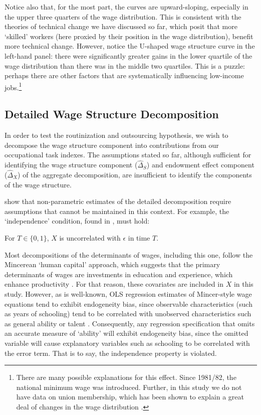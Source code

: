 Notice also that, for the most part, the curves are upward-sloping, especially in the upper three quarters of the wage distribution. This is consistent with the theories of technical change we have discussed so far, which posit that more `skilled' workers (here proxied by their position in the wage distribution), benefit more technical change. However, notice the U-shaped wage structure curve in the left-hand panel: there were significantly greater gains in the lower quartile of the wage distribution than there was in the middle two quartiles. This is a puzzle: perhaps there are other factors that are systematically influencing low-income jobs.\footnote{There are many possible explanations for this effect. Since 1981/82, the national minimum wage was introduced. Further, in this study we do not have data on union membership, which has been shown to explain a great deal of changes in the wage distribution \citep{Leigh2013,Borland1996}.}

\subsection{Detailed Wage Structure Decomposition}

In order to test the routinization and outsourcing hypothesis, we wish to decompose the wage structure component into contributions from our occupational task indexes. The assumptions stated so far, although sufficient for identifying the wage structure component ($\hat{\Delta}_S$) and endowment effect component ($\hat{\Delta}_X$) of the aggregate decomposition, are insufficient to identify the components of the wage structure.

\citep[p.27]{Fortin2011} show that non-parametric estimates of the detailed decomposition require assumptions that cannot be maintained in this context. For example, the `independence' condition, found in \citet{Matzkin2003}, must hold:
\begin{assumption}[Independence]\label{ass:indep}
  For $T\in\{0,1\}$, $X$ is uncorrelated with $\epsilon$ in time $T$.
\end{assumption}
Most decompositions of the determinants of wages, including this one, follow the Mincerean `human capital' approach, which suggests that the primary determinants of wages are investments in education and experience, which enhance productivity \citep{Mincer1962}. For that reason, these covariates are included in $X$ in this study. However, as is well-known, OLS regression estimates of Mincer-style wage equations tend to exhibit endogeneity bias, since observable characteristics (such as years of schooling) tend to be correlated with unobserved characteristics such as general ability or talent \citep{Card1999}. Consequently, any regression specification that omits an accurate measure of `ability' will exhibit endogeneity bias, since the omitted variable will cause explanatory variables such as schooling to be correlated with the error term. That is to say, the independence property is violated.

